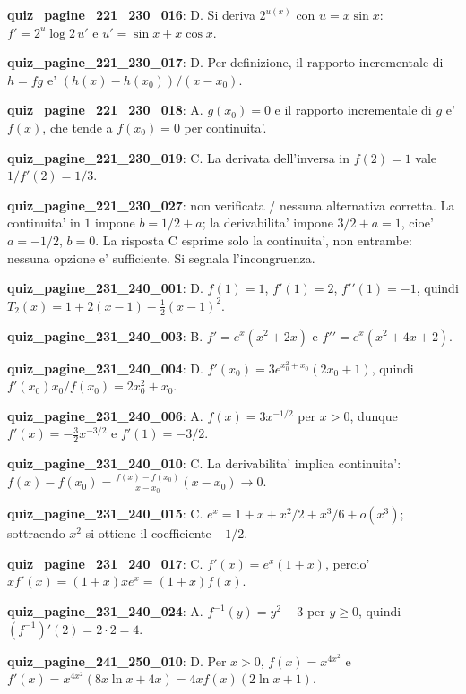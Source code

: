 \documentclass[11pt,a4paper]{article}
\newcounter{quiz}
\begin{document}
\noindent\textbf{quiz\_pagine\_221\_230\_016}: D. Si deriva $2^{u(x)}$ con $u=x\sin x$: $f'=2^u\log2\,u'$ e $u'=\sin x+x\cos x$.\par\medskip
\noindent\textbf{quiz\_pagine\_221\_230\_017}: D. Per definizione, il rapporto incrementale di $h=fg$ e' $(h(x)-h(x_0))/(x-x_0)$.\par\medskip
\noindent\textbf{quiz\_pagine\_221\_230\_018}: A. $g(x_0)=0$ e il rapporto incrementale di $g$ e' $f(x)$, che tende a $f(x_0)=0$ per continuita'.\par\medskip
\noindent\textbf{quiz\_pagine\_221\_230\_019}: C. La derivata dell'inversa in $f(2)=1$ vale $1/f'(2)=1/3$.\par\medskip
\noindent\textbf{quiz\_pagine\_221\_230\_027}: non verificata / nessuna alternativa corretta. La continuita' in $1$ impone $b=1/2+a$; la derivabilita' impone $3/2+a=1$, cioe' $a=-1/2$, $b=0$. La risposta C esprime solo la continuita', non entrambe: nessuna opzione e' sufficiente. Si segnala l'incongruenza.\par\medskip
\noindent\textbf{quiz\_pagine\_231\_240\_001}: D. $f(1)=1$, $f\prime(1)=2$, $f\prime\prime(1)=-1$, quindi $T_2(x)=1+2(x-1)-\frac12(x-1)^2$.\par\medskip
\noindent\textbf{quiz\_pagine\_231\_240\_003}: B. $f\prime=e^x(x^2+2x)$ e $f\prime\prime=e^x(x^2+4x+2)$.\par\medskip
\noindent\textbf{quiz\_pagine\_231\_240\_004}: D. $f\prime(x_0)=3e^{x_0^2+x_0}(2x_0+1)$, quindi $f\prime(x_0)x_0/f(x_0)=2x_0^2+x_0$.\par\medskip
\noindent\textbf{quiz\_pagine\_231\_240\_006}: A. $f(x)=3x^{-1/2}$ per $x>0$, dunque $f\prime(x)=-\frac32x^{-3/2}$ e $f\prime(1)=-3/2$.\par\medskip
\noindent\textbf{quiz\_pagine\_231\_240\_010}: C. La derivabilita' implica continuita': $f(x)-f(x_0)=\frac{f(x)-f(x_0)}{x-x_0}(x-x_0)\to0$.\par\medskip
\noindent\textbf{quiz\_pagine\_231\_240\_015}: C. $e^x=1+x+x^2/2+x^3/6+o(x^3)$; sottraendo $x^2$ si ottiene il coefficiente $-1/2$.\par\medskip
\noindent\textbf{quiz\_pagine\_231\_240\_017}: C. $f\prime(x)=e^x(1+x)$, percio' $xf\prime(x)=(1+x)xe^x=(1+x)f(x)$.\par\medskip
\noindent\textbf{quiz\_pagine\_231\_240\_024}: A. $f^{-1}(y)=y^2-3$ per $y\geq0$, quindi $(f^{-1})\prime(2)=2\cdot2=4$.\par\medskip
\noindent\textbf{quiz\_pagine\_241\_250\_010}: D. Per $x>0$, $f(x)=x^{4x^2}$ e $f\prime(x)=x^{4x^2}(8x\ln x+4x)=4x f(x)(2\ln x+1)$.\par\medskip
\end{document}
